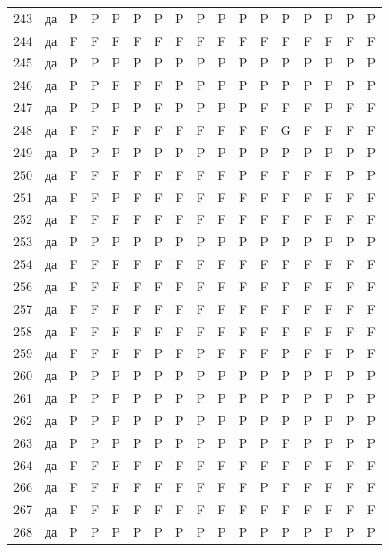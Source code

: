 \begin{table}[p]
\begin{tabular*}{\textwidth}{@{\extracolsep{\fill}}rcccccccccccccccc}
243 & да & P & P & P & P & P & P & P & P & P & P & P & P & P & P & P\\
244 & да & F & F & F & F & F & F & F & F & F & F & F & F & F & F & F\\
245 & да & P & P & P & P & P & P & P & P & P & P & P & P & P & P & P\\
246 & да & P & P & F & F & F & P & P & P & P & P & P & P & P & P & P\\
247 & да & P & P & P & P & F & P & P & P & P & F & F & F & P & F & F\\
248 & да & F & F & F & F & F & F & F & F & F & F & G & F & F & F & F\\
249 & да & P & P & P & P & P & P & P & P & P & P & P & P & P & P & P\\
250 & да & F & F & F & F & F & F & F & F & P & F & F & F & F & P & P\\
251 & да & F & F & P & F & F & F & F & F & F & F & F & F & F & F & F\\
252 & да & F & F & F & F & F & F & F & F & F & F & F & F & F & F & F\\
253 & да & P & P & P & P & P & P & P & P & P & P & P & P & P & P & P\\
254 & да & F & F & F & F & F & F & F & F & F & F & F & F & F & F & F\\
256 & да & F & F & F & F & F & F & F & F & F & F & F & F & F & F & F\\
257 & да & F & F & F & F & F & F & F & F & F & F & F & F & F & F & F\\
258 & да & F & F & F & F & F & F & F & F & F & F & F & F & F & F & F\\
259 & да & F & F & F & F & P & F & P & F & F & F & P & F & F & P & F\\
260 & да & P & P & P & P & P & P & P & P & P & P & P & P & P & P & P\\
261 & да & P & P & P & P & P & P & P & P & P & P & P & P & P & P & P\\
262 & да & P & P & P & P & P & P & P & P & P & P & P & P & P & P & P\\
263 & да & P & P & P & P & P & P & P & P & P & P & F & P & P & P & P\\
264 & да & F & F & F & F & F & F & F & F & F & F & F & F & F & F & F\\
266 & да & F & F & F & F & F & F & F & F & F & P & F & F & F & F & F\\
267 & да & F & F & F & F & F & F & F & F & F & F & F & F & F & F & F\\
268 & да & P & P & P & P & P & P & P & P & P & P & P & P & P & P & P\\
\bottomrule\end{tabular*}\end{table}
\clearpage

